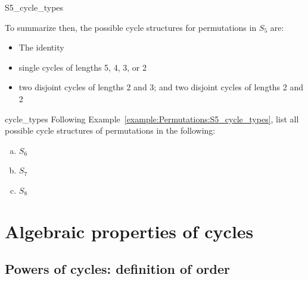 \begin{example}{S5_cycle_types}

\noindent
To summarize then, the possible cycle structures for  permutations in $S_5$ are:
\begin{itemize}
\item
The identity
\item
single cycles of lengths 5, 4, 3, or 2
\item
two disjoint cycles of lengths 2 and 3;  and two disjoint cycles of lengths 2 and 2
\end{itemize}
\end{example}

\begin{exercise}{cycle_types}
Following Example~\ref{example:Permutations:S5_cycle_types}, list all possible cycle structures of permutations in the following:
\begin{multicols}{3}
\begin{enumerate}[(a)]
\item
$S_6$
\item
$S_7$
\item
$S_8$
\end{enumerate}
\end{multicols}
\end{exercise}

\section{Algebraic properties of cycles \quad 
{}}
\label{sec:Permutations:CycleAlgebraicProperties}

\subsection{Powers of cycles: definition of order}
\label{subsec:Permutations:CycleAlgebraicProperties:DefinitionOfOrder}

